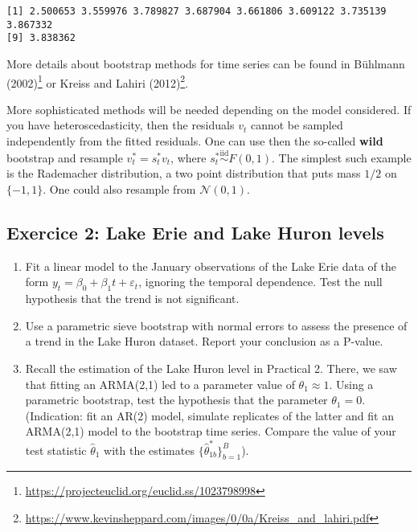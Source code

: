 \documentclass[]{book}
\providecommand{\tightlist}{%
  \setlength{\itemsep}{0pt}\setlength{\parskip}{0pt}}
\let\rmarkdownfootnote\footnote%
\def\footnote{\protect\rmarkdownfootnote}
\renewcommand{\href}[2]{#2\footnote{\url{#1}}}
\begin{document}
\begin{verbatim}
[1] 2.500653 3.559976 3.789827 3.687904 3.661806 3.609122 3.735139 3.867332
[9] 3.838362
\end{verbatim}

More details about bootstrap methods for time series can be found in \href{https://projecteuclid.org/euclid.ss/1023798998}{Bühlmann (2002)} or \href{https://www.kevinsheppard.com/images/0/0a/Kreiss_and_lahiri.pdf}{Kreiss and Lahiri (2012)}.

More sophisticated methods will be needed depending on the model considered. If you have heteroscedasticity, then the residuals \(v_t\) cannot be sampled independently from the fitted residuals. One can use then the so-called \textbf{wild} bootstrap and resample \(v_t^*=s_t^*v_t\), where \(s_t^* \stackrel{\mathrm{iid}}{\sim}F(0,1)\). The simplest such example is the Rademacher distribution, a two point distribution that puts mass \(1/2\) on \(\{-1, 1\}\). One could also resample from \(\mathcal{N}(0,1)\).

\hypertarget{exercice-2-lake-erie-and-lake-huron-levels}{%
\subsection{Exercice 2: Lake Erie and Lake Huron levels}\label{exercice-2-lake-erie-and-lake-huron-levels}}

\begin{enumerate}
\def\labelenumi{\arabic{enumi}.}
\tightlist
\item
  Fit a linear model to the January observations of the Lake Erie data of the form \(y_t=\beta_0+\beta_1t+\varepsilon_t\), ignoring the temporal dependence. Test the null hypothesis that the trend is not significant.
\item
  Use a parametric sieve bootstrap with normal errors to assess the presence of a trend in the Lake Huron dataset. Report your conclusion as a P-value.
\item
  Recall the estimation of the Lake Huron level in Practical 2. There, we saw that fitting an ARMA(2,1) led to a parameter value of \(\theta_1 \approx 1\). Using a parametric bootstrap, test the hypothesis that the parameter \(\theta_1=0\). (Indication: fit an AR(2) model, simulate replicates of the latter and fit an ARMA(2,1) model to the bootstrap time series. Compare the value of your test statistic \(\hat{\theta}_1\) with the estimates \(\{\hat{\theta}_{1b}^{*}\}_{b=1}^B\)).
\end{enumerate}
\end{document}
